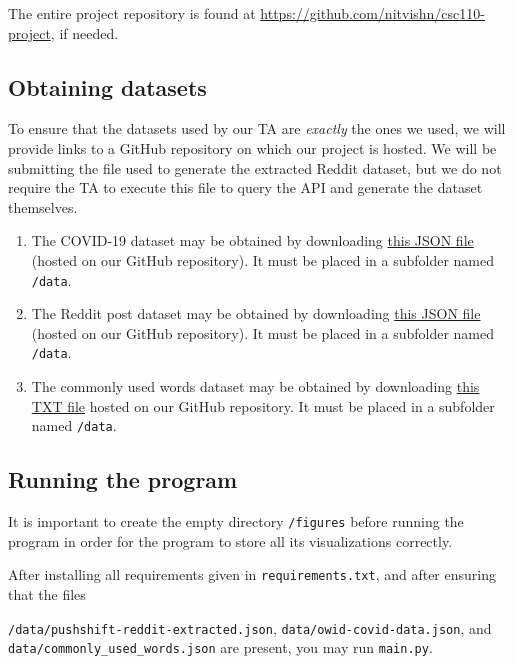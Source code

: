 \documentclass[fontsize=11pt]{article}
\begin{document}
The entire project repository is found at \href{https://github.com/nitvishn/csc110-project}{https://github.com/nitvishn/csc110-project}, if needed.

\subsection{Obtaining datasets}

To ensure that the datasets used by our TA are \textit{exactly} the ones we used, we will provide links to a GitHub repository on which our project is hosted. We will be submitting the file used to generate the extracted Reddit dataset, but we do not require the TA to execute this file to query the API and generate the dataset themselves.

\begin{enumerate}
    \item The COVID-19 dataset may be obtained by downloading \href{https://raw.githubusercontent.com/nitvishn/csc110-project/master/data/pushshift-reddit-extracted.json}{this JSON file} (hosted on our GitHub repository). It must be placed in a subfolder named \texttt{/data}.
    \item The Reddit post dataset may be obtained by downloading \href{https://raw.githubusercontent.com/nitvishn/csc110-project/master/data/owid-covid-data.json}{this JSON file} (hosted on our GitHub repository). It must be placed in a subfolder named \texttt{/data}.
    \item The commonly used words dataset may be obtained by downloading \href{https://raw.githubusercontent.com/nitvishn/csc110-project/master/data/commonly_used_words.txt}{this TXT file} hosted on our GitHub repository. It must be placed in a subfolder named \texttt{/data}.
\end{enumerate}

\subsection{Running the program}

It is important to create the empty directory \texttt{/figures} before running the program in order for the program to store all its visualizations correctly.

After installing all requirements given in \texttt{requirements.txt}, and after ensuring that the files 

\texttt{/data/pushshift-reddit-extracted.json}, \texttt{data/owid-covid-data.json}, and \texttt{data/commonly\_used\_words.json} are present, you may run \texttt{main.py}.
\end{document}
